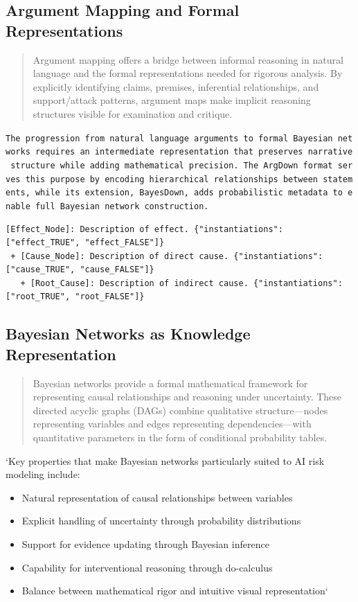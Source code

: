 \documentclass[
  11pt,
  letterpaper,
]{book}
\providecommand{\tightlist}{%
  \setlength{\itemsep}{0pt}\setlength{\parskip}{0pt}}
\begin{document}
\subsection{Argument Mapping and Formal
Representations}\label{sec-argument-mapping}

\begin{quote}
Argument mapping offers a bridge between informal reasoning in natural
language and the formal representations needed for rigorous analysis. By
explicitly identifying claims, premises, inferential relationships, and
support/attack patterns, argument maps make implicit reasoning
structures visible for examination and critique.
\end{quote}

\texttt{The\ progression\ from\ natural\ language\ arguments\ to\ formal\ Bayesian\ networks\ requires\ an\ intermediate\ representation\ that\ preserves\ narrative\ structure\ while\ adding\ mathematical\ precision.\ The\ ArgDown\ format\ serves\ this\ purpose\ by\ encoding\ hierarchical\ relationships\ between\ statements,\ while\ its\ extension,\ BayesDown,\ adds\ probabilistic\ metadata\ to\ enable\ full\ Bayesian\ network\ construction.}

\begin{verbatim}
[Effect_Node]: Description of effect. {"instantiations": ["effect_TRUE", "effect_FALSE"]}
 + [Cause_Node]: Description of direct cause. {"instantiations": ["cause_TRUE", "cause_FALSE"]}
   + [Root_Cause]: Description of indirect cause. {"instantiations": ["root_TRUE", "root_FALSE"]}
\end{verbatim}

\subsection{Bayesian Networks as Knowledge
Representation}\label{sec-bayesian-networks}

\begin{quote}
Bayesian networks provide a formal mathematical framework for
representing causal relationships and reasoning under uncertainty. These
directed acyclic graphs (DAGs) combine qualitative structure---nodes
representing variables and edges representing dependencies---with
quantitative parameters in the form of conditional probability tables.
\end{quote}

`Key properties that make Bayesian networks particularly suited to AI
risk modeling include:

\begin{itemize}
\tightlist
\item
  Natural representation of causal relationships between variables
\item
  Explicit handling of uncertainty through probability distributions
\item
  Support for evidence updating through Bayesian inference
\item
  Capability for interventional reasoning through do-calculus
\item
  Balance between mathematical rigor and intuitive visual
  representation`
\end{itemize}
\end{document}
